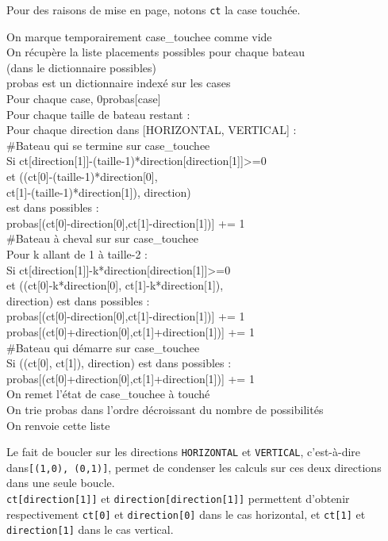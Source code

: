 Pour des raisons de mise en page, notons \texttt{ct} la case touchée.
\begin{algo1}
On marque temporairement case\_touchee comme vide\\ 
On récupère la liste placements possibles pour chaque bateau\\
 (dans le dictionnaire possibles)\\
probas est un dictionnaire indexé sur les cases\\
Pour chaque case, 0\sto probas[case]\\
Pour chaque taille de bateau restant :\\
Pour chaque direction dans [HORIZONTAL, VERTICAL] :\\
\#Bateau qui se termine sur case\_touchee\\
Si ct[direction[1]]-(taille-1)*direction[direction[1]]>=0\\
et ((ct[0]-(taille-1)*direction[0],\\ 
ct[1]-(taille-1)*direction[1]), direction)\\
est dans possibles :\\
probas[(ct[0]-direction[0],ct[1]-direction[1])] += 1\\
\#Bateau à cheval sur sur case\_touchee\\
Pour k allant de 1 à taille-2 :\\
Si ct[direction[1]]-k*direction[direction[1]]>=0\\
et ((ct[0]-k*direction[0], ct[1]-k*direction[1]),\\
 direction) est dans possibles :\\
probas[(ct[0]-direction[0],ct[1]-direction[1])] += 1\\
probas[(ct[0]+direction[0],ct[1]+direction[1])] += 1\\
\#Bateau qui démarre sur case\_touchee\\
Si ((ct[0], ct[1]), direction) est dans possibles :\\
probas[(ct[0]+direction[0],ct[1]+direction[1])] += 1\\
On remet l'état de case\_touchee à touché\\
On trie probas dans l'ordre décroissant du nombre de possibilités\\
On renvoie cette liste\\
\end{algo1}

Le fait de boucler sur les directions \texttt{HORIZONTAL} et \texttt{VERTICAL}, c'est-à-dire dans\texttt{[(1,0), (0,1)]}, permet de condenser les calculs sur ces deux directions dans une seule boucle.\\
\texttt{ct[direction[1]]} et \texttt{direction[direction[1]]} permettent d'obtenir respectivement \texttt{ct[0]} et \texttt{direction[0]} dans le cas horizontal, et \texttt{ct[1]} et \texttt{direction[1]} dans le cas vertical.

